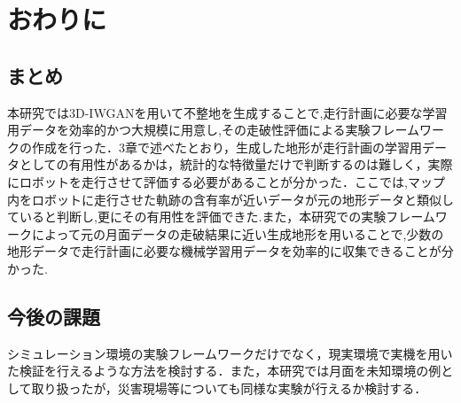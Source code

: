 \newpage
\section{おわりに}
\label{sec:conclusion}

\subsection{まとめ}
本研究では3D-IWGANを用いて不整地を生成することで,走行計画に必要な学習用データを効率的かつ大規模に用意し,その走破性評価による実験フレームワークの作成を行った．3章で述べたとおり，生成した地形が走行計画の学習用データとしての有用性があるかは，統計的な特徴量だけで判断するのは難しく，実際にロボットを走行させて評価する必要があることが分かった．ここでは,マップ内をロボットに走行させた軌跡の含有率が近いデータが元の地形データと類似していると判断し,更にその有用性を評価できた.また，本研究での実験フレームワークによって元の月面データの走破結果に近い生成地形を用いることで,少数の地形データで走行計画に必要な機械学習用データを効率的に収集できることが分かった.


\subsection{今後の課題}
シミュレーション環境の実験フレームワークだけでなく，現実環境で実機を用いた検証を行えるような方法を検討する．また，本研究では月面を未知環境の例として取り扱ったが，災害現場等についても同様な実験が行えるか検討する．